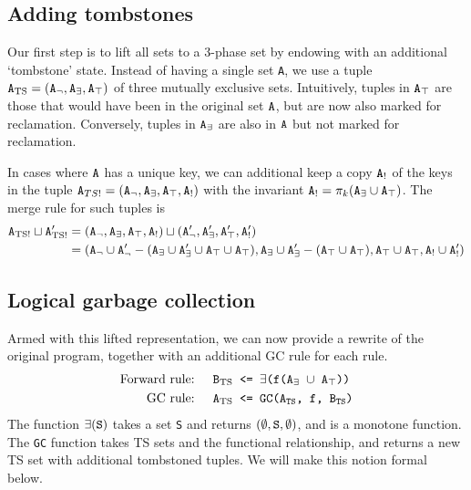 \documentclass[10pt]{proc}
\numberwithin{equation}{section}
\renewcommand{\tt}[1]{\ifmmode\text{\texttt{#1}}\else\texttt{#1}\fi}
\begin{document}
\subsection{Adding tombstones}
Our first step is to lift all sets to a 3-phase set by endowing with an additional `tombstone' state.
Instead of having a single set \tt{A}, we use a tuple $\tt{A}_\text{TS} = (\tt{A}_\neg, \tt{A}_\exists, \tt{A}_\top)$ of three mutually exclusive sets.
Intuitively, tuples in $\tt{A}_\top$ are those that would have been in the original set $\tt{A}$, but are now also marked for reclamation.
Conversely, tuples in $\tt{A}_\exists$ are also in $\tt{A}$ but not marked for reclamation.

In cases where $\tt{A}$ has a unique key, we can additional keep a copy $\tt{A}_!$ of the keys in the tuple $\tt{A}_{TS!} = (\tt{A}_\neg, \tt{A}_\exists, \tt{A}_\top, \tt{A}_!)$ with the invariant $\tt{A}_! = \pi_k(\tt{A}_\exists \cup \tt{A}_\top)$.
The merge rule for such tuples is
\begin{align*}
\tt{A}_\text{TS!} \sqcup \tt{A}_\text{TS!}'
&= (\tt{A}_\neg, \tt{A}_\exists, \tt{A}_\top, \tt{A}_!) \sqcup (\tt{A}'_\neg, \tt{A}'_\exists, \tt{A}'_\top, \tt{A}'_!)\\
&= (\tt{A}_\neg \cup \tt{A}'_\neg - (\tt{A}_\exists \cup \tt{A}'_\exists \cup \tt{A}_\top \cup \tt{A}_\top), \tt{A}_\exists \cup \tt{A}'_\exists - (\tt{A}_\top \cup \tt{A}_\top), \tt{A}_\top \cup \tt{A}_\top, \tt{A}_! \cup \tt{A}'_!)
\end{align*}


\subsection{Logical garbage collection}
Armed with this lifted representation, we can now provide a rewrite of the original program, together with an additional GC rule for each rule.
\begin{align}
\text{Forward rule: } && \tt{B}_\text{TS} &\tt{ <= $\exists$(f(A$_\exists$ $\cup$ A$_\top$))}\label{eq:forwardrule}\\
\text{GC rule: } && \tt{A}_\text{TS} &\tt{ <= GC(A$_\text{TS}$, f, B$_\text{TS}$)}\label{eq:gcrule}
\end{align}
The function $\exists(\tt{S})$ takes a set \tt{S} and returns $(\emptyset, \tt{S}, \emptyset)$, and is a monotone function.
The \tt{GC} function takes TS sets and the functional relationship, and returns a new TS set with additional tombstoned tuples.
We will make this notion formal below.
\end{document}
